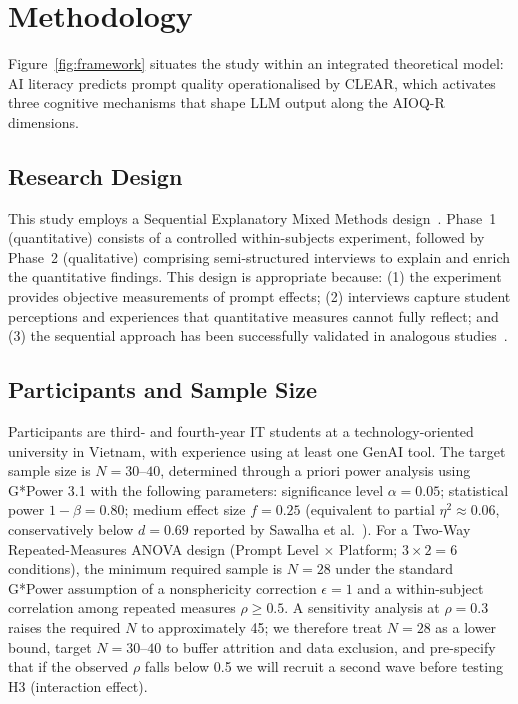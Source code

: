 \documentclass[runningheads]{llncs}
\begin{document}
\section{Methodology}\label{sec:method}

Figure~\ref{fig:framework} situates the study within an integrated theoretical model: AI literacy predicts prompt quality operationalised by CLEAR, which activates three cognitive mechanisms that shape LLM output along the AIOQ-R dimensions.

\subsection{Research Design}

This study employs a Sequential Explanatory Mixed Methods design~\cite{Creswell2018}. Phase~1 (quantitative) consists of a controlled within-subjects experiment, followed by Phase~2 (qualitative) comprising semi-structured interviews to explain and enrich the quantitative findings. This design is appropriate because: (1) the experiment provides objective measurements of prompt effects; (2) interviews capture student perceptions and experiences that quantitative measures cannot fully reflect; and (3) the sequential approach has been successfully validated in analogous studies~\cite{Woo2025,Kumar2025}.

\subsection{Participants and Sample Size}

Participants are third- and fourth-year IT students at a technology-oriented university in Vietnam, with experience using at least one GenAI tool. The target sample size is $N = 30$--$40$, determined through a priori power analysis using G*Power 3.1 with the following parameters: significance level $\alpha = 0.05$; statistical power $1 - \beta = 0.80$; medium effect size $f = 0.25$ (equivalent to partial $\eta^2 \approx 0.06$, conservatively below $d = 0.69$ reported by Sawalha et al.~\cite{Sawalha2024}). For a Two-Way Repeated-Measures ANOVA design (Prompt Level $\times$ Platform; $3 \times 2 = 6$ conditions), the minimum required sample is $N = 28$ under the standard G*Power assumption of a nonsphericity correction $\epsilon = 1$ and a within-subject correlation among repeated measures $\rho \geq 0.5$. A sensitivity analysis at $\rho = 0.3$ raises the required $N$ to approximately 45; we therefore treat $N = 28$ as a lower bound, target $N = 30$--$40$ to buffer attrition and data exclusion, and pre-specify that if the observed $\rho$ falls below 0.5 we will recruit a second wave before testing H3 (interaction effect).
\end{document}
